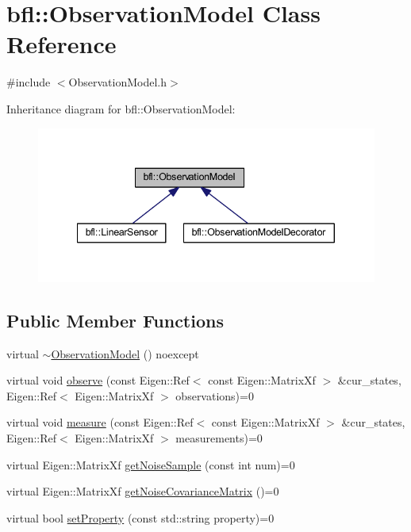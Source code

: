 \hypertarget{classbfl_1_1ObservationModel}{}\section{bfl\+:\+:Observation\+Model Class Reference}
\label{classbfl_1_1ObservationModel}


{\ttfamily \#include $<$Observation\+Model.\+h$>$}



Inheritance diagram for bfl\+:\+:Observation\+Model\+:
\nopagebreak
\begin{figure}[H]
\begin{center}
\leavevmode
\includegraphics[width=340pt]{classbfl_1_1ObservationModel__inherit__graph}
\end{center}
\end{figure}
\subsection*{Public Member Functions}
\begin{DoxyCompactItemize}
\item 
virtual \mbox{\hyperlink{classbfl_1_1ObservationModel_ab4033bc78992bb350c9102f5e9d2fbc9}{$\sim$\+Observation\+Model}} () noexcept
\item 
virtual void \mbox{\hyperlink{classbfl_1_1ObservationModel_a2dd06fa6df453e491e1ab73e46f33d18}{observe}} (const Eigen\+::\+Ref$<$ const Eigen\+::\+Matrix\+Xf $>$ \&cur\+\_\+states, Eigen\+::\+Ref$<$ Eigen\+::\+Matrix\+Xf $>$ observations)=0
\item 
virtual void \mbox{\hyperlink{classbfl_1_1ObservationModel_a0cde643e52b6c24d80d1b49e1b58f4c0}{measure}} (const Eigen\+::\+Ref$<$ const Eigen\+::\+Matrix\+Xf $>$ \&cur\+\_\+states, Eigen\+::\+Ref$<$ Eigen\+::\+Matrix\+Xf $>$ measurements)=0
\item 
virtual Eigen\+::\+Matrix\+Xf \mbox{\hyperlink{classbfl_1_1ObservationModel_a45e8cec2a18ef49bf586c8895c13a31b}{get\+Noise\+Sample}} (const int num)=0
\item 
virtual Eigen\+::\+Matrix\+Xf \mbox{\hyperlink{classbfl_1_1ObservationModel_a63357b1456a4a5387e55d31ddb0b9b50}{get\+Noise\+Covariance\+Matrix}} ()=0
\item 
virtual bool \mbox{\hyperlink{classbfl_1_1ObservationModel_a05991496674f63b6ea6c8a34da34194d}{set\+Property}} (const std\+::string property)=0
\end{DoxyCompactItemize}


